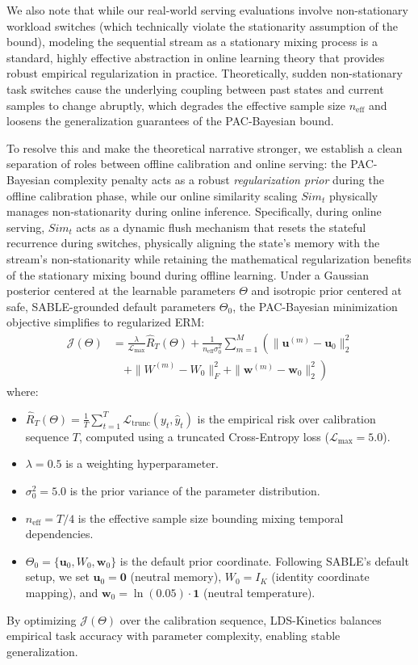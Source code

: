 We also note that while our real-world serving evaluations involve non-stationary workload switches (which technically violate the stationarity assumption of the bound), modeling the sequential stream as a stationary mixing process is a standard, highly effective abstraction in online learning theory that provides robust empirical regularization in practice. Theoretically, sudden non-stationary task switches cause the underlying coupling between past states and current samples to change abruptly, which degrades the effective sample size $n_{\text{eff}}$ and loosens the generalization guarantees of the PAC-Bayesian bound. 

To resolve this and make the theoretical narrative stronger, we establish a clean separation of roles between offline calibration and online serving: the PAC-Bayesian complexity penalty acts as a robust \emph{regularization prior} during the offline calibration phase, while our online similarity scaling $Sim_t$ physically manages non-stationarity during online inference. Specifically, during online serving, $Sim_t$ acts as a dynamic flush mechanism that resets the stateful recurrence during switches, physically aligning the state's memory with the stream's non-stationarity while retaining the mathematical regularization benefits of the stationary mixing bound during offline learning. Under a Gaussian posterior centered at the learnable parameters $\Theta$ and isotropic prior centered at safe, SABLE-grounded default parameters $\Theta_0$, the PAC-Bayesian minimization objective simplifies to regularized ERM:
\begin{equation}
\begin{aligned}
    \mathcal{J}(\Theta) &= \frac{\lambda}{\mathcal{L}_{\max}} \hat{R}_T(\Theta) + \frac{1}{n_{\text{eff}} \sigma_0^2} \sum_{m=1}^M \left( \|\mathbf{u}^{(m)} - \mathbf{u}_0\|_2^2 \right. \\
    &\quad \left. + \|W^{(m)} - W_0\|_F^2 + \|\mathbf{w}^{(m)} - \mathbf{w}_0\|_2^2 \right)
\end{aligned}
\end{equation}
where:
\begin{itemize}
    \item $\hat{R}_T(\Theta) = \frac{1}{T} \sum_{t=1}^T \mathcal{L}_{\text{trunc}}(y_t, \hat{y}_t)$ is the empirical risk over calibration sequence $T$, computed using a truncated Cross-Entropy loss ($\mathcal{L}_{\max} = 5.0$).
    \item $\lambda = 0.5$ is a weighting hyperparameter.
    \item $\sigma_0^2 = 5.0$ is the prior variance of the parameter distribution.
    \item $n_{\text{eff}} = T/4$ is the effective sample size bounding mixing temporal dependencies.
    \item $\Theta_0 = \{ \mathbf{u}_0, W_0, \mathbf{w}_0 \}$ is the default prior coordinate. Following SABLE's default setup, we set $\mathbf{u}_0 = \mathbf{0}$ (neutral memory), $W_0 = I_K$ (identity coordinate mapping), and $\mathbf{w}_0 = \ln(0.05) \cdot \mathbf{1}$ (neutral temperature).
\end{itemize}
By optimizing $\mathcal{J}(\Theta)$ over the calibration sequence, LDS-Kinetics balances empirical task accuracy with parameter complexity, enabling stable generalization.
